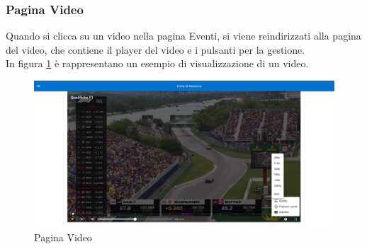 \subsubsection{Pagina Video}
Quando si clicca su un video nella pagina Eventi, si viene reindirizzati alla pagina del video, che contiene il player del video e i pulsanti per la gestione.\\
In figura \ref{fig:video} è rappresentano un esempio di visualizzazione di un video.
\begin{figure}[H]
    \centering
    \includegraphics[width=1\textwidth]{images/interface/video.png}
    \caption{Pagina Video}
    \label{fig:video}
\end{figure}
